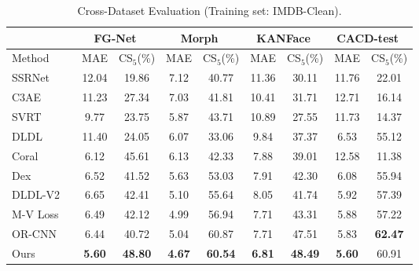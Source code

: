 \begin{table*}[ht] 
	\caption{Cross-Dataset Evaluation (Training set: IMDB-Clean).}\label{tab:cross-db-res}
	\begin{center}
    		\begin{threeparttable}
		\begin{tabular}{l|c|c|c|c|c|c|c|c}
    		\toprule
            & \multicolumn{2}{c|}{FG-Net~\cite{fgnet2002}} 
            & \multicolumn{2}{c|}{Morph~\cite{ricanekMORPHLongitudinalImage2006}} 
            &
            \multicolumn{2}{c|}{KANFace~\cite{georgopoulosInvestigatingBiasDeep2020}} & \multicolumn{2}{c}{CACD-test~\cite{chenFaceRecognitionRetrieval2015}}
			\\ 
			\midrule \hline
            Method & MAE & CS$_5$(\%) & MAE & CS$_5$(\%) & MAE & CS$_5$(\%) 
            & MAE & CS$_5$(\%) 
            \\ 
            \hline 
			SSRNet\tnote{$\ast$}~~\cite{ssrnet2018} & 12.04 & 19.86 & 7.12 & 40.77 & 11.36 & 30.11 & 11.76&22.01 
			\\
			C3AE\tnote{$\ast$}~~\cite{zhangC3AEExploringLimits2019} & 11.23 
			& 27.34 
			& 7.03 
			& 41.81
			& 10.41
			& 31.71
			& 12.71
			& 16.14
			\\
			SVRT\tnote{$\ast$}~~\cite{imScaleVaryingTripletRanking2019} & 9.77 & 23.75 & 5.87 &43.71 &10.89 & 27.55 & 11.73 & 14.37 
			\\
			DLDL\tnote{$\dagger$}~~\cite{gaoDeepLabelDistribution2017}  & 11.40 & 24.05 &6.07 & 33.06 & 9.84 &37.37 &6.53 &  55.12 
\\
			Coral\tnote{$\ast$}~~\cite{Cao2020coral}    
			& 6.12
			& 45.61
			& 6.13
			& 42.33
			& 7.88
			& 39.01
			& 12.58
			& 11.38
			\\
			Dex\tnote{$\dagger$}~~\cite{rotheDeepExpectationReal2018}  & 6.52 & 41.52 &  5.63 & 53.03 & 7.91 & 42.30 & 6.08 & 55.94 
			\\
			DLDL-V2\tnote{$\dagger$}~~\cite{gaoAgeEstimationUsing2018}   & 6.65 & 42.41  & 5.10 & 55.64 &8.05 & 41.74  & 5.92 & 57.39 
			\\
			M-V Loss\tnote{$\dagger$}~~\cite{panMeanVarianceLossDeep2018}   & 6.49  & 42.12  &4.99 &56.94 & 7.71 & 43.31 & 5.88 & 57.22 
			\\
			OR-CNN\tnote{$\dagger$}~~\cite{niuOrdinalRegressionMultiple2016} 
			& 6.44
			& 40.72
			&  5.04
			& 60.87
			& 7.71
			& 47.51
			& 5.83
			& \textbf{62.47}
			\\
			\hline
			Ours\tnote{$\dagger$}   & \textbf{5.60} &  \textbf{48.80} & \textbf{4.67} & \textbf{60.54} & \textbf{6.81} & \textbf{48.49} & \textbf{5.60} & 60.91 \\ \bottomrule


\end{tabular}
\end{threeparttable}
\end{center}
\end{table*}
